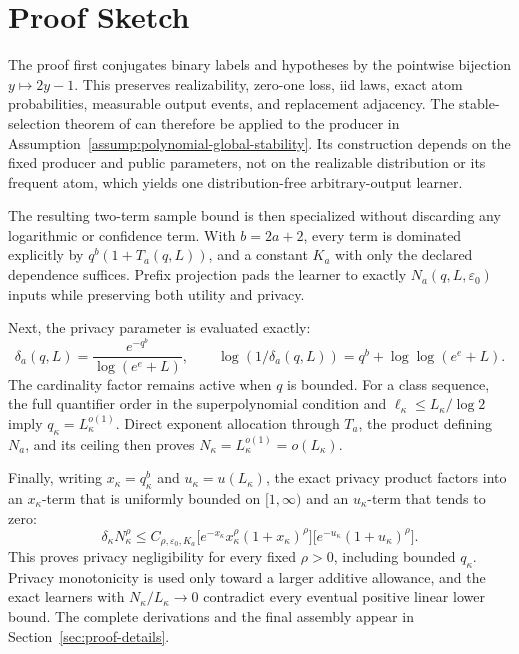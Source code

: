 \section{Proof Sketch}\label{sec:proof-sketch}

The proof first conjugates binary labels and hypotheses by the
pointwise bijection \(y\mapsto2y-1\).  This preserves realizability,
zero-one loss, iid laws, exact atom probabilities, measurable output
events, and replacement adjacency.  The stable-selection theorem of
\citet{bun2021equivalence} can therefore be applied to the producer
in Assumption~\ref{assump:polynomial-global-stability}.  Its
construction depends on the fixed producer and public parameters,
not on the realizable distribution or its frequent atom, which yields
one distribution-free arbitrary-output learner.

The resulting two-term sample bound is then specialized without
discarding any logarithmic or confidence term.  With
\(b=2a+2\), every term is dominated explicitly by
\(q^b(1+T_a(q,L))\), and a constant \(K_a\) with only the declared
dependence suffices.  Prefix projection pads the learner to exactly
\(N_a(q,L,\varepsilon_0)\) inputs while preserving both utility and
privacy.

Next, the privacy parameter is evaluated exactly:
\[
\delta_a(q,L)
=\frac{e^{-q^b}}{\log(e^e+L)},\qquad
\log(1/\delta_a(q,L))
=q^b+\log\log(e^e+L).
\]
The cardinality factor remains active when \(q\) is bounded.
For a class sequence, the full quantifier order in the
superpolynomial condition and
\(\ell_\kappa\leq L_\kappa/\log2\) imply
\(q_\kappa=L_\kappa^{o(1)}\).  Direct exponent allocation through
\(T_a\), the product defining \(N_a\), and its ceiling then proves
\(N_\kappa=L_\kappa^{o(1)}=o(L_\kappa)\).

Finally, writing \(x_\kappa=q_\kappa^b\) and
\(u_\kappa=u(L_\kappa)\), the exact privacy product factors into an
\(x_\kappa\)-term that is uniformly bounded on \([1,\infty)\) and an
\(u_\kappa\)-term that tends to zero:
\[
\delta_\kappa N_\kappa^\rho
\leq C_{\rho,\varepsilon_0,K_a}
\bigl[e^{-x_\kappa}x_\kappa^\rho(1+x_\kappa)^\rho\bigr]
\bigl[e^{-u_\kappa}(1+u_\kappa)^\rho\bigr].
\]
This proves privacy negligibility for every fixed \(\rho>0\),
including bounded \(q_\kappa\).  Privacy monotonicity is used only
toward a larger additive allowance, and the exact learners with
\(N_\kappa/L_\kappa\to0\) contradict every eventual positive linear
lower bound.  The complete derivations and the final assembly appear
in Section~\ref{sec:proof-details}.
